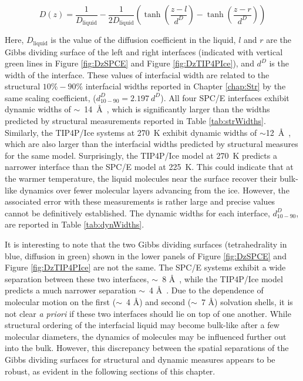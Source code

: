 \begin{equation}\label{eq:Dfit}
  D(z) = \frac{1}{D_\mathrm{liquid}} - \frac{1}{2D_\mathrm{liquid}} \left(
      \tanh \left( \frac{z-l}{d^D} \right) - \tanh \left( \frac{z-r}{d^D} \right) \right)
\end{equation}
  
Here, $D_\mathrm{liquid}$ is the value of the diffusion coefficient in
the liquid, $l$ and $r$ are the Gibbs dividing surface of the left and
right interfaces (indicated with vertical green lines in Figure
\ref{fig:DzSPCE} and Figure \ref{fig:DzTIP4PIce}), and $d^{D}$ is the
width of the interface. These values of interfacial width are related
to the structural $10\%-90\%$ interfacial widths reported in Chapter
\ref{chap:Str} by the same scaling coefficient,
($d_\mathrm{10-90}^{D} = 2.197~d^{D}$). All four SPC/E interfaces
exhibit dynamic widths of $\sim$~14~\AA~, which is significantly
larger than the widths predicted by structural measurements reported
in Table \ref{tab:strWidths}. Similarly, the TIP4P/Ice systems at
270~K exhibit dynamic widths of $\sim$12~\AA~, which are also larger
than the interfacial widths predicted by structural measures for the
same model. Surprisingly, the TIP4P/Ice model at 270~K predicts a
narrower interface than the SPC/E model at 225~K. This could indicate
that at the warmer temperature, the liquid molecules near the surface
recover their bulk-like dynamics over fewer molecular layers advancing
from the ice. However, the associated error with these measurements is
rather large and precise values cannot be definitively
established. The dynamic widths for each interface,
$d_\mathrm{10-90}^{D}$, are reported in Table \ref{tab:dynWidths}.

It is interesting to note that the two Gibbs dividing surfaces
(tetrahedrality in blue, diffusion in green) shown in the lower panels
of Figure \ref{fig:DzSPCE} and Figure \ref{fig:DzTIP4PIce} are not the
same. The SPC/E systems exhibit a wide separation between these two
interfaces, $\sim$~8 \AA~, while the TIP4P/Ice model predicts a much
narrower separation $\sim$~4 \AA~. Due to the dependence of molecular
motion on the first ($\sim$~4 \AA) and second ($\sim$~7 \AA) solvation
shells, it is not clear \textit{a priori} if these two interfaces
should lie on top of one another. While structural ordering of the
interfacial liquid may become bulk-like after a few molecular
diameters, the dynamics of molecules may be influenced further out
into the bulk. However, this discrepancy between the spatial
separations of the Gibbs dividing surfaces for structural and dynamic
measures appears to be robust, as evident in the following sections of
this chapter.

